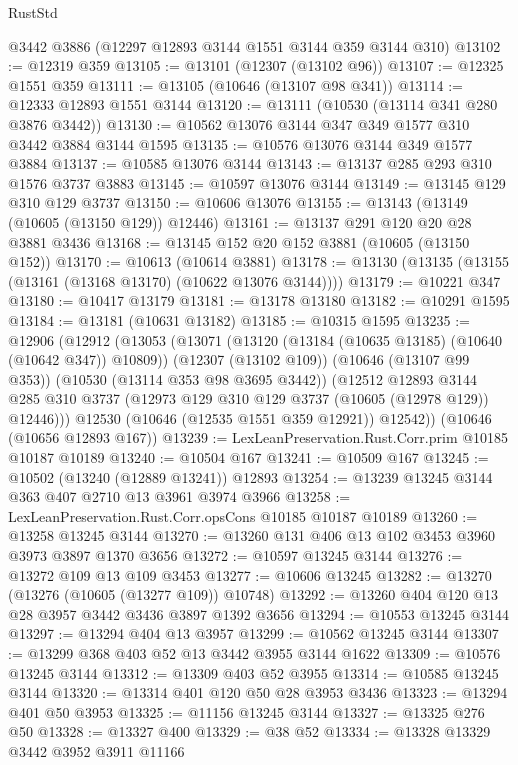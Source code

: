 \begin{lexlean}{RustStd}
\begin{coremodule}
    @3442
    @3886
    (@12297 @12893 @3144 @1551 @3144 @359 @3144 @310)
@13102 := @12319 @359
@13105 := @13101 (@12307 (@13102 @96))
@13107 := @12325 @1551 @359
@13111 := @13105 (@10646 (@13107 @98 @341))
@13114 := @12333 @12893 @1551 @3144
@13120 := @13111 (@10530 (@13114 @341 @280 @3876 @3442))
@13130 := @10562 @13076 @3144 @347 @349 @1577 @310 @3442 @3884 @3144 @1595
@13135 := @10576 @13076 @3144 @349 @1577 @3884
@13137 := @10585 @13076 @3144
@13143 := @13137 @285 @293 @310 @1576 @3737 @3883
@13145 := @10597 @13076 @3144
@13149 := @13145 @129 @310 @129 @3737
@13150 := @10606 @13076
@13155 := @13143 (@13149 (@10605 (@13150 @129)) @12446)
@13161 := @13137 @291 @120 @20 @28 @3881 @3436
@13168 := @13145 @152 @20 @152 @3881 (@10605 (@13150 @152))
@13170 := @10613 (@10614 @3881)
@13178 := @13130 (@13135 (@13155 (@13161 (@13168 @13170) (@10622 @13076 @3144))))
@13179 := @10221 @347
@13180 := @10417 @13179
@13181 := @13178 @13180
@13182 := @10291 @1595
@13184 := @13181 (@10631 @13182)
@13185 := @10315 @1595
@13235 := @12906
    (@12912
      (@13053
        (@13071
          (@13120 (@13184 (@10635 @13185) (@10640 (@10642 @347)) @10809))
          (@12307 (@13102 @109))
          (@10646 (@13107 @99 @353))
          (@10530 (@13114 @353 @98 @3695 @3442))
          (@12512
            @12893
            @3144
            @285
            @310
            @3737
            (@12973 @129 @310 @129 @3737 (@10605 (@12978 @129)) @12446)))
        @12530
        (@10646 (@12535 @1551 @359 @12921))
        @12542))
    (@10646 (@10656 @12893 @167))
@13239 := LexLeanPreservation.Rust.Corr.prim @10185 @10187 @10189
@13240 := @10504 @167
@13241 := @10509 @167
@13245 := @10502 (@13240 (@12889 @13241)) @12893
@13254 := @13239 @13245 @3144 @363 @407 @2710 @13 @3961 @3974 @3966
@13258 := LexLeanPreservation.Rust.Corr.opsCons @10185 @10187 @10189
@13260 := @13258 @13245 @3144
@13270 := @13260 @131 @406 @13 @102 @3453 @3960 @3973 @3897 @1370 @3656
@13272 := @10597 @13245 @3144
@13276 := @13272 @109 @13 @109 @3453
@13277 := @10606 @13245
@13282 := @13270 (@13276 (@10605 (@13277 @109)) @10748)
@13292 := @13260 @404 @120 @13 @28 @3957 @3442 @3436 @3897 @1392 @3656
@13294 := @10553 @13245 @3144
@13297 := @13294 @404 @13 @3957
@13299 := @10562 @13245 @3144
@13307 := @13299 @368 @403 @52 @13 @3442 @3955 @3144 @1622
@13309 := @10576 @13245 @3144
@13312 := @13309 @403 @52 @3955
@13314 := @10585 @13245 @3144
@13320 := @13314 @401 @120 @50 @28 @3953 @3436
@13323 := @13294 @401 @50 @3953
@13325 := @11156 @13245 @3144
@13327 := @13325 @276 @50
@13328 := @13327 @400
@13329 := @38 @52
@13334 := @13328 @13329 @3442 @3952 @3911 @11166

\end{coremodule}
\end{lexlean}
